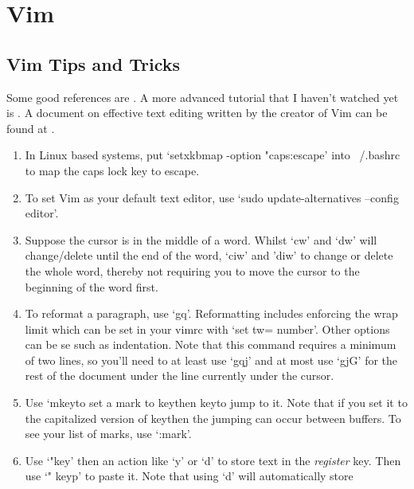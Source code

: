 \chapter{Vim} \label{ChapVim}
\setcounter{page}{1}

\section{Vim Tips and Tricks}
Some good references are \cite{chang2018vim,toomey2015mastering}. A more
advanced tutorial that I haven't watched yet is \cite{chang2020vim}. A document
on effective text editing written by the creator of Vim can be found at
\cite{moolenaar2000seven}.
\begin{enumerate}
    \item In Linux based systems, put `setxkbmap -option "caps:escape' into
        ~/.bashrc to map the caps lock key to escape.
    \item To set Vim as your default text editor, use `sudo update-alternatives
        --config editor'.  \item Suppose the cursor is in the middle of a word.
        Whilst `cw' and `dw' will change/delete until the end of the word, `ciw'
        and 'diw' to change or delete the whole word, thereby not requiring you
        to move the cursor to the beginning of the word first.
    \item To reformat a paragraph, use `gq'. Reformatting includes enforcing the
        wrap limit which can be set in your vimrc with `set tw=\tlangle
        number\trangle'. Other options can be se such as indentation. Note that
        this command requires a minimum of two lines, so you'll need to at least
        use `gqj' and at most use `gjG' for the rest of the document under the
        line currently under the cursor.
    \item Use `m\tlangle key\trangle to set a mark to \tlangle key\trangle then
        \tlangle key\trangle to jump to it.  Note that if you set it to the
        capitalized version of \tlangle key\trangle then the jumping can occur
        between buffers. To see your list of marks, use `:mark'.
    \item Use `"\tlangle key\trangle' then an action like `y' or `d' to store
        text in the \textit{register} \tlangle key\trangle. Then use `"\tlangle
        key\trangle p' to paste it. Note that using `d' will automatically store

\end{enumerate}
